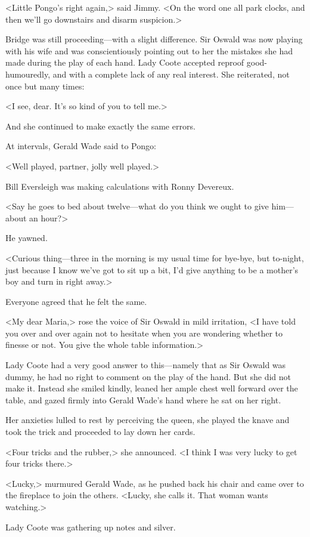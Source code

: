 <Little Pongo's right again,> said Jimmy. <On the word one all park clocks, and then we'll go downstairs and disarm suspicion.>

Bridge was still proceeding—with a slight difference. Sir Oswald was now playing with his wife and was conscientiously pointing out to her the mistakes she had made during the play of each hand. Lady Coote accepted reproof good-humouredly, and with a complete lack of any real interest. She reiterated, not once but many times:

<I see, dear. It's so kind of you to tell me.>

And she continued to make exactly the same errors.

At intervals, Gerald Wade said to Pongo:

<Well played, partner, jolly well played.>

Bill Eversleigh was making calculations with Ronny Devereux.

<Say he goes to bed about twelve—what do you think we ought to give him—about an hour?>

He yawned.

<Curious thing—three in the morning is my usual time for bye-bye, but to-night, just because I know we've got to sit up a bit, I'd give anything to be a mother's boy and turn in right away.>

Everyone agreed that he felt the same.

<My dear Maria,> rose the voice of Sir Oswald in mild irritation, <I have told you over and over again not to hesitate when you are wondering whether to finesse or not. You give the whole table information.>

Lady Coote had a very good answer to this—namely that as Sir Oswald was dummy, he had no right to comment on the play of the hand. But she did not make it. Instead she smiled kindly, leaned her ample chest well forward over the table, and gazed firmly into Gerald Wade's hand where he sat on her right.

Her anxieties lulled to rest by perceiving the queen, she played the knave and took the trick and proceeded to lay down her cards.

<Four tricks and the rubber,> she announced. <I think I was very lucky to get four tricks there.>

<Lucky,> murmured Gerald Wade, as he pushed back his chair and came over to the fireplace to join the others. <Lucky, she calls it. That woman wants watching.>

Lady Coote was gathering up notes and silver.

